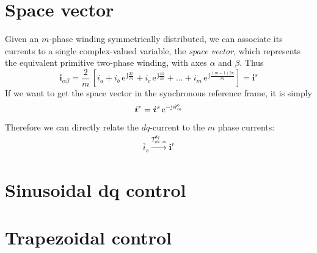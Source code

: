 \documentclass[a4paper,11pt,oneside,fleqn,titlepage]{report}
\newcommand{\eu}{\textrm{e}}
\newcommand{\je}{\textrm{j}}
\newcommand{\thh}{\vartheta}
\newcommand{\thm}{\thh_{\textup{m}}}
\newcommand{\thme}{\thm^{\textup{e}}}
\newcommand{\sv}[1]{\bm{#1}}
\renewcommand{\vec}[1]{\overline{#1}}
\begin{document}
\section{Space vector}
Given an $ m $-phase winding symmetrically distributed, we can associate its 
currents to a single complex-valued variable, the \emph{space vector}, which 
represents the equivalent primitive two-phase winding, with axes $ \alpha $ and 
$ \beta $. Thus
\[
\sv{i}_{\alpha\beta} = \frac{2}{m}\,\left[ 
i_a + i_b\,\eu^{\,\je\frac{2\pi}{m}} + i_c\,\eu^{\,\je\frac{4\pi}{m}} + \ldots
+ i_m\,\eu^{\,\je\frac{(m-1)2\pi}{m}}
\right] = \sv{i}^s
\]
If we want to get the space vector in the synchronous reference frame, it is 
simply
\[
\sv{i}^r = \sv{i}^s\,\eu^{-\je\thme}
\]
Therefore we can directly relate the $ dq $-current to the $ m $ phase currents:
\begin{align*}
\vec{i}_s \xrightarrow{T_{ab\cdots m}^{dq}} \sv{i}^r
\end{align*}


\section{Sinusoidal dq control}


\section{Trapezoidal control}
\end{document}
